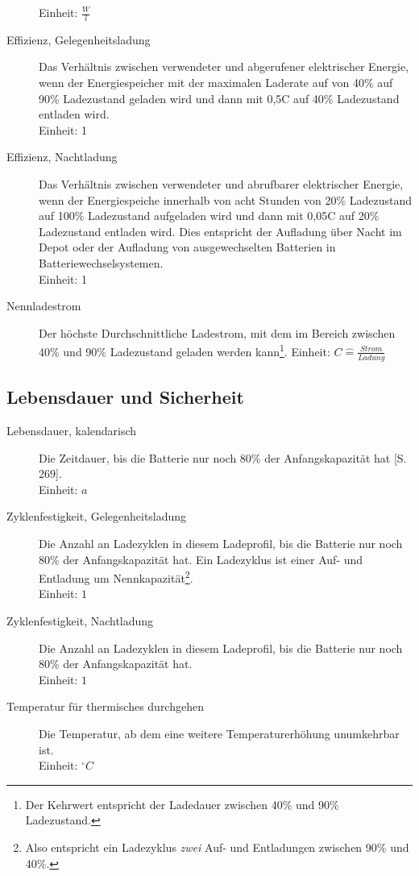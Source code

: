 \begin{description}
	Einheit: $\frac{W}{l}$
	\item[Effizienz, Gelegenheitsladung] Das Verhältnis zwischen verwendeter und abgerufener elektrischer Energie, wenn der Energiespeicher mit der maximalen Laderate auf von 40\% auf 90\% Ladezustand geladen wird und dann mit 0,5C auf 40\% Ladezustand entladen wird.\\
	Einheit: 1
	\item[Effizienz, Nachtladung] Das Verhältnis zwischen verwendeter und abrufbarer elektrischer Energie, wenn der Energiespeiche innerhalb von acht Stunden von 20\% Ladezustand auf 100\% Ladezustand aufgeladen wird und dann mit 0,05C auf 20\% Ladezustand entladen wird. Dies entspricht der Aufladung über Nacht im Depot oder der Aufladung von ausgewechselten Batterien in Batteriewechselsystemen.\\
	Einheit: 1
	\item[Nennladestrom] Der höchste Durchschnittliche Ladestrom, mit dem im Bereich zwischen 40\% und 90\% Ladezustand geladen werden kann\footnote{Der Kehrwert entspricht der Ladedauer zwischen 40\% und 90\% Ladezustand.}.
	Einheit: $C\hat{=} \frac{Strom}{Ladung}$
\end{description}

\subsection{Lebensdauer und Sicherheit}
\begin{description}
	\item[Lebensdauer, kalendarisch] Die Zeitdauer, bis die Batterie nur noch 80\% der Anfangskapazität hat \cite{Sterner:2014}[S. 269]. \\
	Einheit: $a$
	\item[Zyklenfestigkeit, Gelegenheitsladung] Die Anzahl an Ladezyklen in diesem Ladeprofil, bis die Batterie nur noch 80\% der Anfangskapazität hat. Ein Ladezyklus ist einer Auf- und Entladung um Nennkapazität\footnote{Also entspricht ein Ladezyklus \emph{zwei} Auf- und Entladungen zwischen 90\% und 40\%.}.\\
	Einheit: $1$
	\item[Zyklenfestigkeit, Nachtladung] Die Anzahl an Ladezyklen in diesem Ladeprofil, bis die Batterie nur noch 80\% der Anfangskapazität hat.\\
	Einheit: $1$
	\item[Temperatur für thermisches durchgehen] Die Temperatur, ab dem eine weitere Temperaturerhöhung unumkehrbar ist.\\
	Einheit: $^\circ C$
\end{description}

